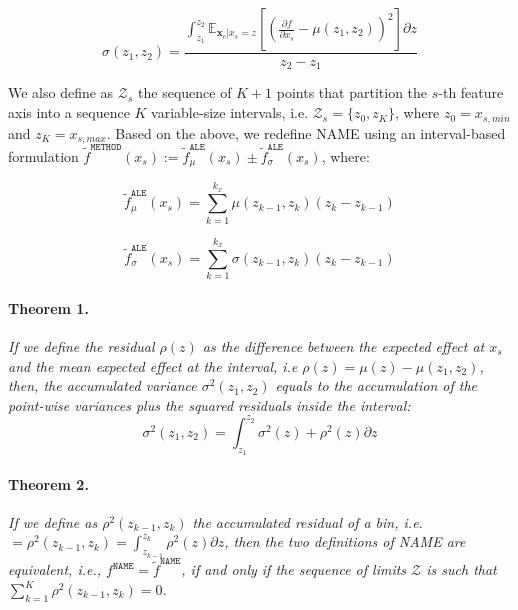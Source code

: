 \documentclass[twoside]{article}
\newcommand{\xc}{\mathbf{x}_c}
\begin{document}
\noindent

\begin{equation}
  \label{eq:var_bin}
  \sigma(z_1, z_2) = \frac{\int_{z_1}^{z_2}
  \mathbb{E}_{\xc|x_s=z} \left [ (\frac{\partial
      f}{\partial x_s} - \mu(z_1, z_2) )^2 \right] \partial z}{z_2 - z_1}
\end{equation}

%
We also define as \(\mathcal{Z}_s\) the sequence of \(K+1\) points that
partition the \(s\)-th feature axis into a sequence \(K\)
variable-size intervals, i.e. \(\mathcal{Z}_s = \{z_0, z_K\}\), where
\(z_0=x_{s,min}\) and \(z_K=x_{s,max}\). Based on the above, we
redefine NAME using an interval-based formulation
\(\tilde{f}^{\mathtt{METHOD}}(x_s):=
\tilde{f}^{\mathtt{ALE}}_{\mu}(x_s) \pm \tilde{f}^{\mathtt{ALE}}_{\sigma}(x_s)\), where:

\begin{equation}
  \label{eq:ALE_2}
  \tilde{f}^{\mathtt{ALE}}_{\mu}(x_s) = \sum_{k=1}^{k_x} \mu(z_{k-1}, z_k) (z_k - z_{k-1})
\end{equation}

\begin{equation}
  \label{eq:ALE_accumulated_var}
  \tilde{f}^{\mathtt{ALE}}_{\sigma}(x_s) =  \sum_{k=1}^{k_x} \sigma(z_{k-1}, z_k) (z_k - z_{k-1})
\end{equation}
%
\paragraph{Theorem 1.}
\label{sec:theorem-1}

\textit{If we define the residual \(\rho(z)\) as the
difference between the expected effect at \(x_s\) and the mean
expected effect at the interval, i.e
\(\rho(z) = \mu(z) - \mu(z_1, z_2)\), then, the accumulated variance
\(\sigma^2(z_1, z_2)\) equals to the accumulation of the point-wise
variances plus the squared residuals inside the interval:
\begin{equation}
 \sigma^2(z_1, z_2) = \int_{z_1}^{z_2} \sigma^2(z) + \rho^2(z) \partial z
\end{equation}}
%

\paragraph{Theorem 2.}
\label{sec:theorem-2}

\textit{If we define as \(\rho^2(z_{k-1}, z_{k})\) the accumulated residual of
a bin, i.e.
\(= \rho^2(z_{k-1}, z_{k}) = \int_{z_{k-1}}^{z_k} \rho^2(z)\partial
z\), then the two definitions of NAME are equivalent, i.e.,
\(f^{\mathtt{NAME}} = \tilde{f}^{\mathtt{NAME}}\), if and only if the
sequence of limits \(\mathcal{Z}\) is such that
\(\sum_{k=1}^K \rho^2(z_{k-1}, z_{k}) = 0\).}
\end{document}
